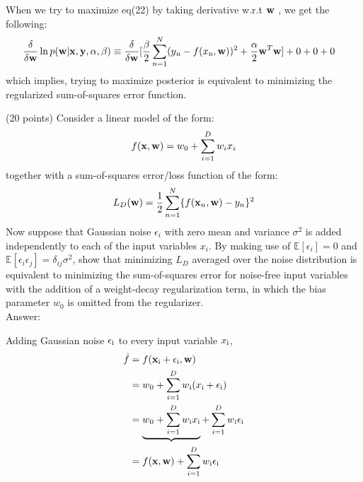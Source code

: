 \documentclass{exam}
\newcommand{\xx}{{\bf{x}}}
\newcommand{\yy}{{\bf{y}}}
\newcommand{\ww}{{\bf{w}}}
\begin{document}
\begin{questions}
When we try to maximize eq(22) by taking derivative w.r.t $\ww$ , we get the following:
\begin{align}
\frac{\delta}{\delta\ww}\ln{p(\ww|\xx,\yy,\alpha,\beta)} 
&\equiv \frac{\delta}{\delta\ww}[ \frac{\beta}{2}\sum_{n=1}^N (y\textsubscript{n}-f(x\textsubscript{n},\ww))^2 + \frac{\alpha}{2}\ww^T\ww] + 0 + 0 + 0
\end{align}
which implies, trying to maximize posterior is equivalent to minimizing the regularized sum-of-squares error function.


\newpage
{} (20 points) Consider a linear model of the form:
$$f(\xx,\ww) = w_0 + \sum_{i=1}^D w_i x_i$$
together with a sum-of-squares error/loss function of the form:
$$L_D(\ww) = \frac{1}{2} \sum_{n=1}^N \{f(\xx_n,\ww) - y_n\}^2$$
Now suppose that Gaussian noise $\epsilon_i$ with zero mean and variance $\sigma^2$ is added independently to each of the input variables $x_i$. By making use of $\mathbb{E}[\epsilon_i]=0$ and $\mathbb{E}[\epsilon_i\epsilon_j]=\delta_{ij} \sigma^2$, show that minimizing $L_D$ averaged over the noise distribution is equivalent to minimizing the sum-of-squares error
for noise-free input variables with the addition of a weight-decay regularization term, in which the bias parameter $w_0$ is omitted from the regularizer.\\

Answer:

Adding Gaussian noise $\epsilon\textsubscript{i}$ to every input variable $x\textsubscript{i}$,
\begin{align}
\hat{f} &= f(\xx\textsubscript{i}+\epsilon\textsubscript{i}, \ww) \\
&= w\textsubscript{0} + \sum_{i=1}^D w\textsubscript{i}(x\textsubscript{i}+\epsilon\textsubscript{i}) \\
&= \underbrace{w\textsubscript{0} + \sum_{i=1}^D w\textsubscript{i}x\textsubscript{i}} + \sum_{i=1}^D w\textsubscript{i}\epsilon\textsubscript{i} \\
&= f(\xx, \ww) + \sum_{i=1}^D w\textsubscript{i}\epsilon\textsubscript{i}
\end{align}


\end{questions}
\end{document}
